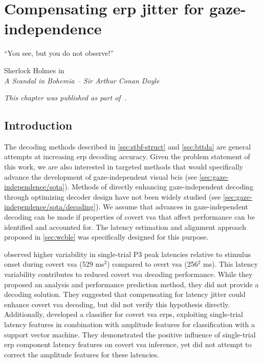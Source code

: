 \chapter{Compensating \acs{erp} jitter for gaze-independence}%
\label{sec:covert-align}
\epigraph{``You see, but you do not observe!''}{Sherlock Holmes in  \\ \emph{A
Scandal in Bohemia -- Sir Arthur Conan Doyle}}
\noindent\emph{This chapter was published as part of~\textcite{VanDenKerchove2024}.}

\section{Introduction}

The decoding methods described in \cref{sec:stbf-struct} and
\cref{sec:bttda} are general attempts at increasing \ac{erp} decoding accuracy.
Given the problem statement of this work, we are also interested in targeted
methods that would specifically advance the development of gaze-independent
visual \acp{bci} (see \cref{sec:gaze-independence/sota}).
Methods of directly enhancing gaze-independent decoding through optimizing
decoder design have not been widely studied (see
\cref{sec:gaze-independence/sota/decoding}).
We assume that advances in gaze-independent decoding can be made if properties
of covert \ac{vsa} that affect performance can be identified and accounted for.
The latency estimation and alignment approach proposed in \cref{sec:wcble}
was specifically designed for this purpose.

\textcite{Arico2014} observed higher variability in single-trial P3 peak
latencies relative to stimulus onset during covert \ac{vsa} (529 ms$^2$) compared to overt
\ac{vsa} (256$^2$ ms).
This latency variability contributes to reduced covert \ac{vsa} decoding performance.
While they proposed an analysis and performance prediction method, they did not provide a
decoding solution.
They suggested that compensating for latency jitter could enhance covert \ac{vsa}
decoding, but did not verify this hypothesis directly.
Additionally, \textcite{Hardiansyah2020} developed a classifier for
covert \ac{vsa} \acp{erp}, exploiting single-trial latency features in combination with
amplitude features for classification with a support vector machine.
They demonstrated the positive influence of single-trial \ac{erp} component latency
features on covert \ac{vsa} inference, yet did not attempt to correct the amplitude
features for these latencies.

